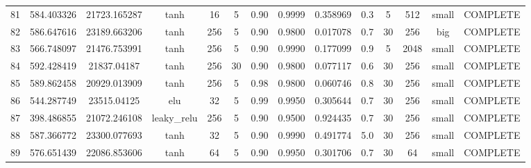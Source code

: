 \begin{longtable}{cccccccccccccc}
                       81 &                 584.403326 &                       21723.165287 &            tanh &          16 &              5 &        0.90 & 0.9999 &       0.358969 &             0.3 &                  5 &      512 &     small & COMPLETE \\
                       82 &                 586.647616 &                       23189.663206 &            tanh &         256 &              5 &        0.90 & 0.9800 &       0.017078 &             0.7 &                 30 &      256 &       big & COMPLETE \\
                       83 &                 566.748097 &                       21476.753991 &            tanh &         256 &              5 &        0.90 & 0.9990 &       0.177099 &             0.9 &                  5 &     2048 &     small & COMPLETE \\
                       84 &                 592.428419 &                        21837.04187 &            tanh &         256 &             30 &        0.90 & 0.9800 &       0.077117 &             0.6 &                 30 &      256 &     small & COMPLETE \\
                       85 &                 589.862458 &                       20929.013909 &            tanh &         256 &              5 &        0.98 & 0.9800 &       0.060746 &             0.8 &                 30 &      256 &     small & COMPLETE \\
                       86 &                 544.287749 &                        23515.04125 &             elu &          32 &              5 &        0.99 & 0.9950 &       0.305644 &             0.7 &                 30 &      256 &     small & COMPLETE \\
                       87 &                 398.486855 &                       21072.246108 &     leaky\_relu &         256 &              5 &        0.90 & 0.9500 &       0.924435 &             0.7 &                 30 &      256 &     small & COMPLETE \\
                       88 &                 587.366772 &                       23300.077693 &            tanh &          32 &              5 &        0.90 & 0.9990 &       0.491774 &             5.0 &                 30 &      256 &     small & COMPLETE \\
                       89 &                 576.651439 &                       22086.853606 &            tanh &          64 &              5 &        0.90 & 0.9950 &       0.301706 &             0.7 &                 30 &       64 &     small & COMPLETE \\

\end{longtable}

